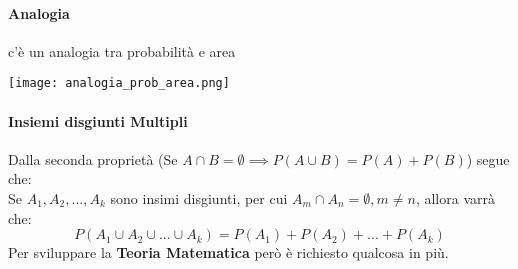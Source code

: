 \paragraph{Analogia} c'è un analogia tra probabilità e area
\begin{center}
    \texttt{[image: analogia\_prob\_area.png]}
\end{center}

\paragraph*{Insiemi disgiunti Multipli}
Dalla seconda proprietà (Se $A\cap B = \emptyset \implies P(A \cup B) = P(A) + P(B)$) segue che:
\\Se $A_1,A_2,...,A_k$ sono insimi disgiunti, per cui $A_m \cap A_n = \emptyset, m\neq n$, allora varrà che:
\[ P(A_1 \cup A_2 \cup ... \cup A_k)= P(A_1) + P(A_2) + ... + P(A_k)\]
Per sviluppare la \textbf{Teoria Matematica} però è richiesto qualcosa in più.


